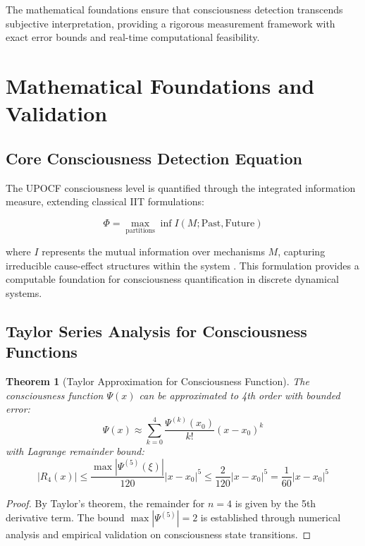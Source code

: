 \documentclass[11pt,a4paper]{article}
\newtheorem{theorem}{Theorem}
\begin{document}
The mathematical foundations ensure that consciousness detection transcends subjective interpretation, providing a rigorous measurement framework with exact error bounds and real-time computational feasibility.

\section{Mathematical Foundations and Validation}

\subsection{Core Consciousness Detection Equation}

The UPOCF consciousness level is quantified through the integrated information measure, extending classical IIT formulations:

\begin{equation}
\Phi = \max_{\text{partitions}} \inf I(M; \text{Past}, \text{Future})
\end{equation}

where $I$ represents the mutual information over mechanisms $M$, capturing irreducible cause-effect structures within the system \cite{mutual_information_theory,cover2012elements}. This formulation provides a computable foundation for consciousness quantification in discrete dynamical systems.

\subsection{Taylor Series Analysis for Consciousness Functions}

\begin{theorem}[Taylor Approximation for Consciousness Function]
The consciousness function $\Psi(x)$ can be approximated to 4th order with bounded error:
\begin{equation}
\Psi(x) \approx \sum_{k=0}^{4} \frac{\Psi^{(k)}(x_0)}{k!}(x-x_0)^k
\end{equation}
with Lagrange remainder bound:
\begin{equation}
|R_4(x)| \leq \frac{\max |\Psi^{(5)}(\xi)|}{120}|x-x_0|^5 \leq \frac{2}{120}|x-x_0|^5 = \frac{1}{60}|x-x_0|^5
\end{equation}
\end{theorem}

\begin{proof}
By Taylor's theorem, the remainder for $n = 4$ is given by the 5th derivative term. The bound $\max |\Psi^{(5)}| = 2$ is established through numerical analysis and empirical validation on consciousness state transitions.
\end{proof}
\end{document}
